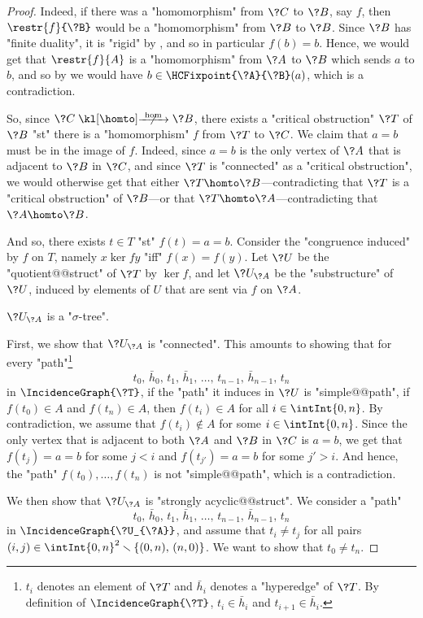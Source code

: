 \begin{proof}
	Indeed, if there was a "homomorphism" from $\?C$ to $\?B$, say $f$, then
	$\restr{f}{\?B}$ would be a "homomorphism" from $\?B$ to $\?B$.
	Since $\?B$ has "finite duality", it is "rigid" by , and so in particular $f(b) = b$.
	Hence, we would get that $\restr{f}{A}$ is a "homomorphism" from $\?A$ to $\?B$
	which sends $a$ to $b$, and so by 
	we would have $b \in \HCFixpoint{\?A}{\?B}(a)$, which is a contradiction.

	So, since $\?C \nothomto \?B$, there exists a "critical obstruction" $\?T$ of $\?B$
	"st" there is a "homomorphism" $f$ from $\?T$ to $\?C$. 
	We claim that $a=b$ must be in the image of $f$. Indeed, since $a=b$ is the only vertex
	of $\?A$ that is adjacent to $\?B$ in $\?C$, and since $\?T$ is "connected" as a
	"critical obstruction",
	we would otherwise get that either $\?T \homto \?B$---contradicting that $\?T$ is a "critical obstruction" of $\?B$---or that $\?T \homto \?A$---contradicting that $\?A \homto \?B$.
	
	And so, there exists $t \in T$ "st" $f(t) = a = b$.
	Consider the "congruence induced" by $f$ on $T$, namely $x \ker{f} y$ "iff"
	$f(x) = f(y)$. Let $\?U$ be the "quotient@@struct" of $\?T$ by $\ker{f}$,
	and let $\?U_{\?A}$ be the "substructure" of $\?U$, induced by elements
	of $U$ that are sent via $f$ on $\?A$.
	\begin{claim}
		\AP\label{claim:hyperedge-consistency-uniform-convergence-trees-are-trees}
		$\?U_{\?A}$ is a "$\sigma$-tree".
	\end{claim}
	First, we show that $\?U_{\?A}$ is "connected". This amounts to showing that for
	every "path"\footnote{$t_i$ denotes an element of $\?T$ and $\bar h_i$ denotes a "hyperedge" of $\?T$. By definition of $\IncidenceGraph{\?T}$, $t_i \in \bar h_i$ and
	$t_{i+1} \in \bar h_i$.}
	\[
		t_0,\, \bar h_0,\, t_1,\, \bar h_1,\, \dotsc,\, t_{n-1},\, \bar h_{n-1},\, t_n
	\]
	in $\IncidenceGraph{\?T}$, if the "path" it induces in $\?U$ is "simple@@path",
	if $f(t_0) \in A$ and $f(t_n) \in A$,
	then $f(t_i) \in A$ for all $i \in \intInt{0,n}$.
	By contradiction, we assume that $f(t_i) \not\in A$ for some $i \in \intInt{0,n}$.
	Since the only vertex that is adjacent to both $\?A$ and $\?B$ in $\?C$ is $a=b$,
	we get that $f(t_j) = a = b$ for some $j < i$ and $f(t_{j'}) = a = b$ for some $j' > i$.
	And hence, the "path" $f(t_0), \dotsc, f(t_n)$ is not "simple@@path", which is a contradiction.

	We then show that $\?U_{\?A}$ is "strongly acyclic@@struct". We consider a "path"
	\[
		t_0,\, \bar h_0,\, t_1,\, \bar h_1,\, \dotsc,\, t_{n-1},\, \bar h_{n-1},\, t_n
	\]
	in $\IncidenceGraph{\?U_{\?A}}$, and assume that $t_i \neq t_j$ for all pairs
	$(i,j) \in \intInt{0,n}^2 \smallsetminus \{(0,n),\, (n,0)\}$.
	We want to show that $t_0 \neq t_n$.


\end{proof}
